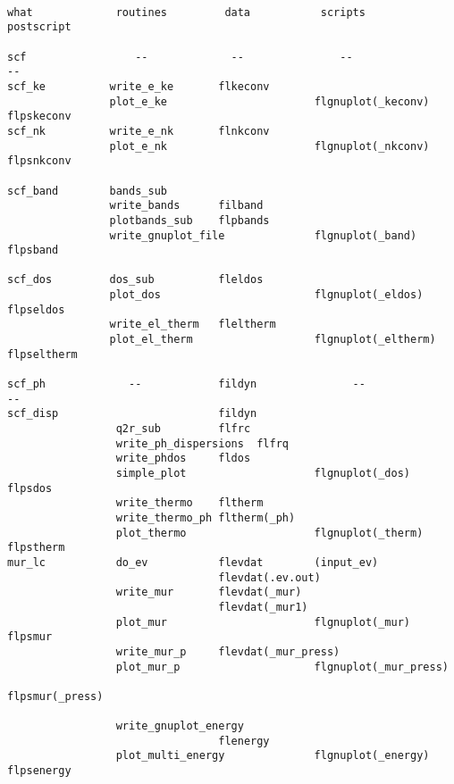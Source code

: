 \documentclass[12pt,a4paper,twoside]{report}
\begin{document}
\begin{footnotesize}
\begin{verbatim}

what             routines         data           scripts            postscript

scf                 --             --               --                 --
scf_ke          write_e_ke       flkeconv
                plot_e_ke                       flgnuplot(_keconv)  flpskeconv
scf_nk          write_e_nk       flnkconv
                plot_e_nk                       flgnuplot(_nkconv)  flpsnkconv

scf_band        bands_sub
                write_bands      filband
                plotbands_sub    flpbands
                write_gnuplot_file              flgnuplot(_band)    flpsband     

scf_dos         dos_sub          fleldos
                plot_dos                        flgnuplot(_eldos)   flpseldos
                write_el_therm   fleltherm
                plot_el_therm                   flgnuplot(_eltherm) flpseltherm

scf_ph             --            fildyn               --                  --
scf_disp                         fildyn
                 q2r_sub         flfrc
                 write_ph_dispersions  flfrq
                 write_phdos     fldos
                 simple_plot                    flgnuplot(_dos)     flpsdos
                 write_thermo    fltherm
                 write_thermo_ph fltherm(_ph)
                 plot_thermo                    flgnuplot(_therm)   flpstherm
mur_lc           do_ev           flevdat        (input_ev)
                                 flevdat(.ev.out)
                 write_mur       flevdat(_mur)
                                 flevdat(_mur1)
                 plot_mur                       flgnuplot(_mur)     flpsmur
                 write_mur_p     flevdat(_mur_press)
                 plot_mur_p                     flgnuplot(_mur_press) 
                                                                flpsmur(_press)

                 write_gnuplot_energy
                                 flenergy
                 plot_multi_energy              flgnuplot(_energy)  flpsenergy


\end{verbatim}
\end{footnotesize}
\end{document}
